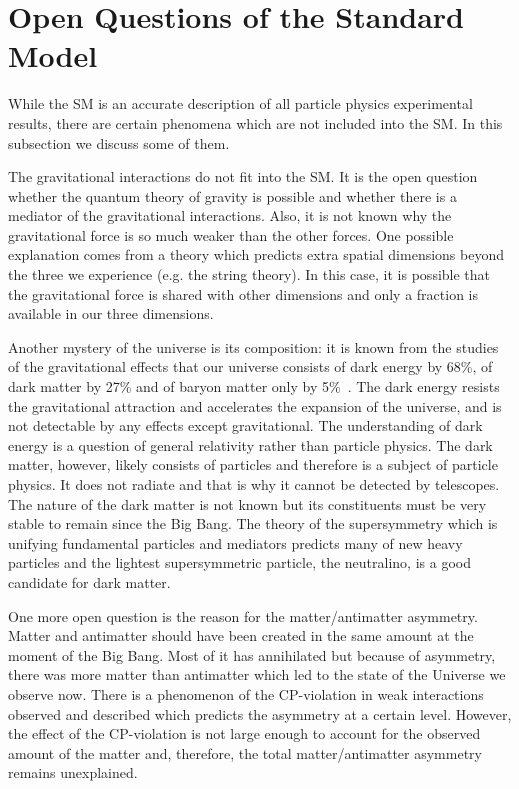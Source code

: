 \section{Open Questions of the Standard Model}


While the SM is an accurate description of all particle physics experimental results, there are certain phenomena which are not included into the SM. In this subsection we discuss some of them.

The gravitational interactions do not fit into the SM. It is the open question whether the quantum theory of gravity is possible and whether there is a mediator of the gravitational interactions. Also, it is not known why the gravitational force is so much weaker than the other forces. One possible explanation comes from a theory which predicts extra spatial dimensions beyond the three we experience (e.g. the string theory). In this case, it is possible that the gravitational force is shared with other dimensions and only a fraction is available in our three dimensions.

Another mystery of the universe is its composition: it is known from the studies of the gravitational effects that our universe consists of dark energy by 68\%, of dark matter by 27\% and of baryon matter only by 5\%~\cite{ref_NASA}. The dark energy resists the gravitational attraction and accelerates the expansion of the universe, and is not detectable by any effects except gravitational. The understanding of dark energy is a question of general relativity rather than particle physics. The dark matter, however, likely consists of particles and therefore is a subject of particle physics. It does not radiate and that is why it cannot be detected by telescopes. The nature of the dark matter is not known but its constituents must be very stable to remain since the Big Bang. The theory of the supersymmetry which is unifying fundamental particles and mediators predicts many of new heavy particles and the lightest supersymmetric particle, the neutralino, is a good candidate for dark matter.

One more open question is the reason for the matter/antimatter asymmetry. Matter and antimatter should have been created in the same amount at the moment of the Big Bang. Most of it has annihilated but because of asymmetry, there was more matter than antimatter which led to the state of the Universe we observe now. There is a phenomenon of the CP-violation in weak interactions observed and described which predicts the asymmetry at a certain level. However, the effect of the CP-violation is not large enough to account for the observed amount of the matter and, therefore, the total matter/antimatter asymmetry remains unexplained. 

